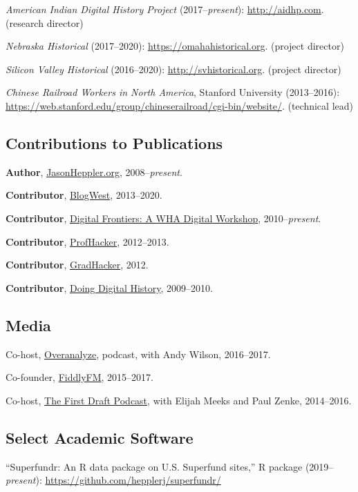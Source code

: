 \documentclass[10pt]{article}
\begin{document}
\textit{American Indian Digital History Project} (2017--\textit{present}): \url{http://aidhp.com}. (research director)

\textit{Nebraska Historical} (2017--2020): \url{https://omahahistorical.org}. (project director)

\textit{Silicon Valley Historical} (2016--2020): \url{http://svhistorical.org}. (project director)

\textit{Chinese Railroad Workers in North America}, Stanford University (2013--2016): \url{https://web.stanford.edu/group/chineserailroad/cgi-bin/website/}. (technical lead)

\subsection*{Contributions to Publications}

\textbf{Author}, \href{http://jasonheppler.org}{JasonHeppler.org}, 2008--\textit{present}.

\textbf{Contributor}, \href{http://blogwest.org/}{BlogWest}, 2013--2020.

\textbf{Contributor}, \href{http://whadigitalfrontiers.com/}{Digital Frontiers: A WHA Digital Workshop}, 2010--\textit{present}.

\textbf{Contributor}, \href{http://chronicle.com/blogs/profhacker/}{ProfHacker}, 2012--2013.

\textbf{Contributor}, \href{https://www.insidehighered.com/blogs/gradhacker}{GradHacker}, 2012.

\textbf{Contributor}, \href{http://digitalhistory.unl.edu/}{Doing Digital History}, 2009--2010.

\subsection{Media}

Co-host, \href{http://overanalyze.fireside.fm}{Overanalyze}, podcast, with Andy Wilson, 2016--2017.

Co-founder, \href{http://fiddly.fm}{FiddlyFM}, 2015--2017.

Co-host, \href{http://www.fiddly.fm/firstdraft/}{The First Draft Podcast}, with Elijah Meeks and Paul Zenke, 2014--2016.

\subsection{Select Academic Software}

``Superfundr: An R data package on U.S. Superfund sites,'' R package (2019--\textit{present}): \url{https://github.com/hepplerj/superfundr/}
\end{document}
